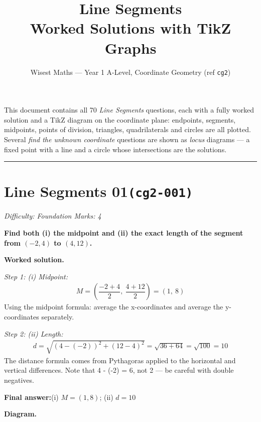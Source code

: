 \documentclass[11pt]{article}
\title{\textbf{Line Segments}\\[0.3em]\large Worked Solutions with TikZ Graphs}
\author{Wisest Maths --- Year 1 A-Level, Coordinate Geometry (ref \texttt{cg2})}
\date{}
\newcommand{\question}[1]{\par\medskip\noindent\textbf{#1}\par}
\begin{document}
\maketitle
\noindent This document contains all 70 \emph{Line Segments} questions, each with a fully worked
solution and a TikZ diagram on the coordinate plane: endpoints, segments, midpoints, points of division,
triangles, quadrilaterals and circles are all plotted. Several \emph{find the unknown coordinate} questions
are shown as \emph{locus} diagrams --- a fixed point with a line and a circle whose intersections are the
solutions.
\tableofcontents
\bigskip
\hrule

\section*{Line Segments 01\quad\small\texttt{(cg2-001)}}
\textit{Difficulty: Foundation \quad\textbar\quad Marks: 4}

\question{Find both (i) the midpoint and (ii) the exact length of the segment from \( (-2, 4) \) to \( (4, 12) \).}

\textbf{Worked solution.}

\textit{Step 1: (i) Midpoint:}
\[\begin{gathered}
M = \left(\dfrac{-2 + 4}{2},\ \dfrac{4 + 12}{2}\right) = (1,\ 8)
\end{gathered}\]
Using the midpoint formula: average the x-coordinates and average the y-coordinates separately.

\textit{Step 2: (ii) Length:}
\[\begin{gathered}
d = \sqrt{(4 - (-2))^2 + (12 - 4)^2} = \sqrt{36 + 64} = \sqrt{100} = 10
\end{gathered}\]
The distance formula comes from Pythagoras applied to the horizontal and vertical differences. Note that 4 - (-2) = 6, not 2 --- be careful with double negatives.

\begin{answerbox}
\textbf{Final answer:}\quad (i) \(\displaystyle M = (1, 8)\); (ii) \(\displaystyle d = 10\)
\end{answerbox}
\textbf{Diagram.}
\end{document}
